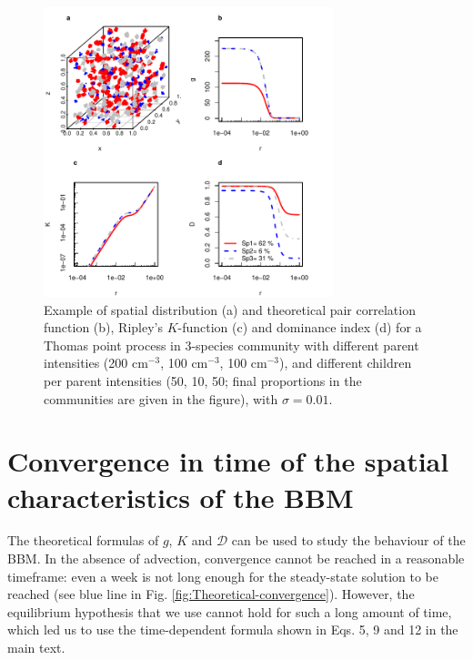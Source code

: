 \documentclass[english]{article}
\begin{document}
\begin{figure}[H]
\begin{centering}
\includegraphics[width=0.75\textwidth]{../code/figure/example_Thomas_distribution}
\par\end{centering}
\caption{Example of spatial distribution (a) and theoretical pair correlation
function (b), Ripley's $K$-function (c) and dominance index (d) for
a Thomas point process in 3-species community with different parent
intensities (200 cm$^{-3}$, 100 cm$^{-3}$, 100 cm$^{-3}$), and
different children per parent intensities (50, 10, 50; final proportions
in the communities are given in the figure), with $\sigma=0.01$.\label{fig:Example-Thomas}}
\end{figure}


\section{Convergence in time of the spatial characteristics of the BBM}

The theoretical formulas of $g$, $K$ and $\mathcal{D}$ can be used
to study the behaviour of the BBM. In the absence of advection, convergence
cannot be reached in a reasonable timeframe: even a week is not long
enough for the steady-state solution to be reached (see blue line
in Fig. \ref{fig:Theoretical-convergence}). However, the equilibrium
hypothesis that we use cannot hold for such a long amount of time,
which led us to use the time-dependent formula shown in Eqs. 5, 9
and 12 in the main text.
\end{document}
